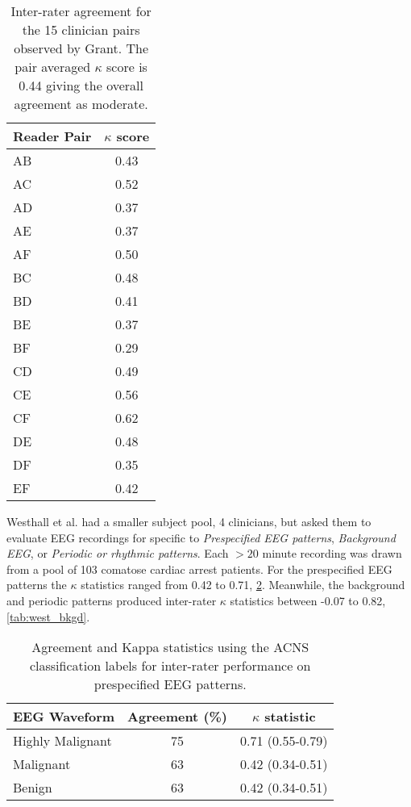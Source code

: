 \begin{table}[ht]
\centering
\caption[Inter-rater agreement of clinicians]{Inter-rater agreement for the 15 clinician pairs observed by Grant. The pair averaged $\kappa$ score is 0.44 giving the overall agreement as moderate.}
\begin{tabular}{l c}
\toprule
Reader Pair & $\kappa$ score \\
\midrule
AB	&	0.43\\
AC	&	0.52\\
AD	&	0.37\\
AE	&	0.37\\
AF	&	0.50\\
BC	&	0.48\\
BD	&	0.41\\
BE	&	0.37\\
BF	&	0.29\\
CD	&	0.49\\
CE	&	0.56\\
CF	&	0.62\\
DE	&	0.48\\
DF	&	0.35\\
EF	&	0.42\\
\bottomrule
\end{tabular}
\label{tab:grant_inter}
\end{table}

Westhall et al. \cite{Westhall2015} had a smaller subject pool, 4 clinicians, but asked them to evaluate \ac{EEG} recordings for specific to \emph{Prespecified \ac{EEG} patterns}, \emph{Background \ac{EEG}}, or \emph{Periodic or rhythmic patterns}. Each $>20$ minute recording was drawn from a pool of 103 comatose cardiac arrest patients. For the prespecified \ac{EEG} patterns the $\kappa$ statistics ranged from 0.42 to 0.71, \cref{tab:westhall_inter}. Meanwhile, the background and periodic patterns produced inter-rater $\kappa$ statistics between -0.07 to 0.82, \cref{tab:west_bkgd}.

\begin{table}[ht]
\caption[Inter-rater classification]{Agreement and Kappa statistics using the ACNS classification labels for inter-rater performance on prespecified \ac{EEG} patterns.}
\centering
\begin{tabular}{l c c}
\toprule
EEG Waveform & Agreement (\%) & $\kappa$ statistic \\
\midrule
Highly Malignant	& 75	& 0.71 (0.55-0.79) \\
Malignant			& 63	& 0.42 (0.34-0.51) \\
Benign			& 63	& 0.42 (0.34-0.51) \\
\bottomrule
\end{tabular}
\label{tab:westhall_inter}
\end{table}

